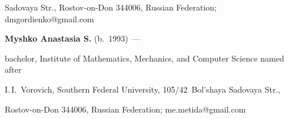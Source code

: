 Sadovaya Str., Rostov-on-Don 344006, Russian Federation; \mbox{dmgordienko@gmail.com}





\vspace*{3pt}





\noindent


\textbf{Myshko Anastasia S.} (b.\ 1993)~--- 


bachelor, Institute of Mathematics, Mechanics, and Computer Science named after 


 I.\,I.~Vorovich, Southern Federal University, 105/42~Bol'shaya Sadovaya Str., 


Rostov-on-Don 344006, Russian Federation; \mbox{me.metida@gmail.com}


\label{end\stat}








\renewcommand{\bibname}{\protect\rm Литература}


